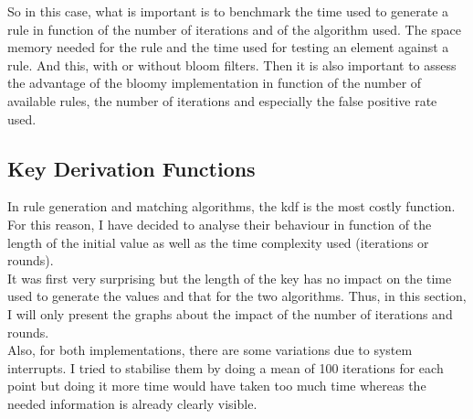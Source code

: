 \documentclass{eplmastersthesis}
\begin{document}
So in this case, what is important is to benchmark the time used to generate a rule in function of the number of iterations and of the algorithm used. The space memory needed for the rule and the time used for testing an element against a rule.
And this, with or without bloom filters. Then it is also important to assess the advantage of the bloomy implementation in function of the number of available rules, the number of iterations and especially the false positive rate used.

\subsection{Key Derivation Functions}
\label{sec:KeyDerivationFunction}
In rule generation and matching algorithms, the \gls{kdf} is the most costly function. For this reason, I have decided to analyse their behaviour in function of the length of the initial value as well as the time complexity used (iterations or rounds).\\

It was first very surprising but the length of the key has no impact on the time used to generate the values and that for the two algorithms. Thus, in this section, I will only present the graphs about the impact of the number of iterations and rounds.\\

Also, for both implementations, there are some variations due to system interrupts. I tried to stabilise them by doing a mean of 100 iterations for each point but doing it more time would have taken too much time whereas the needed information is already clearly visible.\\
\end{document}
